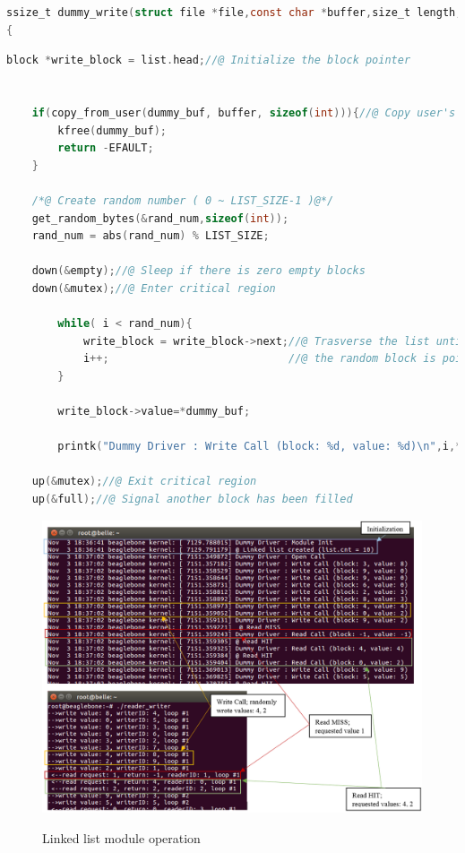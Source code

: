 \documentclass[letterpaper,12pt] {article}
\begin{document}
\begin{lstlisting}[firstnumber = 136 ,language=C  ]
ssize_t dummy_write(struct file *file,const char *buffer,size_t length,...
{
\end{lstlisting}
\begin{lstlisting}[firstnumber = 142 ,language=C , caption =  Device write function ]	
	block *write_block = list.head;//@ Initialize the block pointer 

	
	if(copy_from_user(dummy_buf, buffer, sizeof(int))){//@ Copy user's data to dummy 
		kfree(dummy_buf);
		return -EFAULT;
	}
	
	/*@ Create random number ( 0 ~ LIST_SIZE-1 )@*/
	get_random_bytes(&rand_num,sizeof(int));
	rand_num = abs(rand_num) % LIST_SIZE;
	
	down(&empty);//@ Sleep if there is zero empty blocks
	down(&mutex);//@ Enter critical region
	
		while( i < rand_num){
			write_block = write_block->next;//@ Trasverse the list until
			i++;                            //@ the random block is pointed at
		}
		
		write_block->value=*dummy_buf;
		
		printk("Dummy Driver : Write Call (block: %d, value: %d)\n",i,*dummy_buf);
		
	up(&mutex);//@ Exit critical region
	up(&full);//@ Signal another block has been filled
\end{lstlisting}








\begin{figure}[H]
	\centering
	\includegraphics[width=1\textwidth]{task1}\\
	\caption{Linked list module operation}
	\label{task1}
\end{figure}
\end{document}
